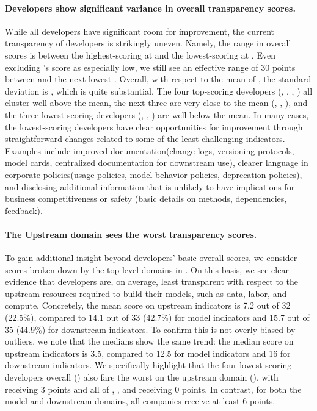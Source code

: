 \documentclass[screen, authorversion, acmsmall]{acmart}
\begin{document}
\paragraph{Developers show significant variance in overall transparency scores.}
While all developers have significant room for improvement, the current transparency of developers is strikingly uneven. 
Namely, the range in overall scores is \scorerange between the highest-scoring \meta at \maxscore and the lowest-scoring \amazon at \minscore.
Even excluding \amazon's score as especially low, we still see an effective range of 30 points between \meta and the next lowest \inflection.
Overall, with respect to the mean of \meanscore, the standard deviation is \stdev, which is quite substantial.
The four top-scoring developers (\meta, \huggingface, \openai, \stability) all cluster well above the mean, the next three are very close to the mean (\google, \anthropic, \cohere), and the three lowest-scoring developers (\aitwentyone, \inflection, \amazon) are well below the mean.
In many cases, the lowest-scoring developers have clear opportunities for improvement through straightforward changes related to some of the least challenging indicators. 
Examples include improved documentation(\eg change logs, versioning protocols, model cards, centralized documentation for downstream use), clearer language in corporate policies(\eg usage policies, model behavior policies, deprecation policies), and disclosing additional information that is unlikely to have implications for business competitiveness or safety (\eg basic details on methods, dependencies, feedback).

\paragraph{The Upstream domain sees the worst transparency scores.}
To gain additional insight beyond developers' basic overall scores, we consider scores broken down by the \numdomains top-level domains in .
On this basis, we see clear evidence that developers are, on average, least transparent with respect to the upstream resources required to build their models, such as data, labor, and compute. 
Concretely, the mean score on upstream indicators is 7.2 out of 32 (22.5\%), compared to 14.1 out of 33 (42.7\%) for model indicators and 15.7 out of 35 (44.9\%) for downstream indicators.
To confirm this is not overly biased by outliers, we note that the medians show the same trend: the median score on upstream indicators is 3.5, compared to 12.5 for model indicators and 16 for downstream indicators.
We specifically highlight that the four lowest-scoring developers overall () also fare the worst on the upstream domain (), with \cohere receiving 3 points and all of \aitwentyone, \inflection, and \amazon receiving 0 points.
In contrast, for both the model and downstream domains, all \numcompanies companies receive at least 6 points. 
\end{document}
